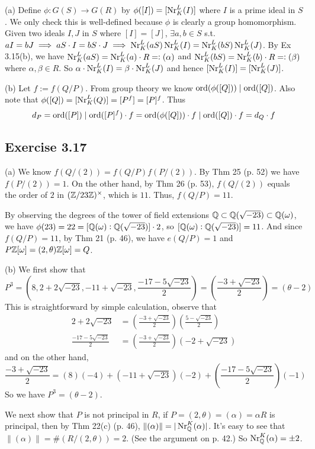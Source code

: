 \documentclass[../Marcus.tex]{subfiles}
\begin{document}
(a) Define $\phi:G(S)\to G(R)$ by $\phi([I])=[\operatorname{Nr}^L_K(I)]$ where $I$ is a prime ideal in $S$. We only check this is well-defined because $\phi$ is clearly a group homomorphism. Given two ideals $I,J$ in $S$ where $[I]=[J]$, $\exists a,b\in S$ s.t. $aI=bJ\implies aS\cdot I=bS\cdot J\implies \operatorname{Nr}^L_K(aS)\operatorname{Nr}^L_K(I)=\operatorname{Nr}^L_K(bS)\operatorname{Nr}^L_K(J)$. By Ex 3.15(b), we have $\operatorname{Nr}^L_K(aS)=\operatorname{Nr}^L_K(a)\cdot R=:(\alpha)$ and $\operatorname{Nr}^L_K(bS)=\operatorname{Nr}^L_K(b)\cdot R=:(\beta)$ where $\alpha,\beta\in R$. So $\alpha\cdot\operatorname{Nr}^L_K(I)=\beta\cdot\operatorname{Nr}^L_K(J)$ and hence $[\operatorname{Nr}^L_K(I)]=[\operatorname{Nr}^L_K(J)]$.

(b) Let $f:=f(Q/P)$. From group theory we know $\operatorname{ord}(\phi([Q]))\mid \operatorname{ord}([Q])$. Also note that $\phi([Q])=[\operatorname{Nr}^L_K(Q)]=[P^f]=[P]^f$. Thus $$d_P=\operatorname{ord}([P])\mid \operatorname{ord}([P]^f)\cdot f = \operatorname{ord}(\phi([Q]))\cdot f\mid \operatorname{ord}([Q])\cdot f=d_Q\cdot f$$

\subsection*{Exercise 3.17}

(a) We know $f(Q/(2))=f(Q/P)f(P/(2))$. By Thm 25 (p. 52) we have $f(P/(2))=1$. On the other hand, by Thm 26 (p. 53), $f(Q/(2))$ equals the order of $2$ in $(\mathbb{Z}/23\mathbb{Z})^{\times}$, which is $11$. Thus, $f(Q/P)=11$.

By observing the degrees of the tower of field extensions $\mathbb{Q}\subset \mathbb{Q}(\sqrt{-23})\subset \mathbb{Q}(\omega)$, we have $\phi(23)=22=[\mathbb{Q}(\omega):\mathbb{Q}(\sqrt{-23})]\cdot 2$, so $[\mathbb{Q}(\omega):\mathbb{Q}(\sqrt{-23})]=11$. And since $f(Q/P)=11$, by Thm 21 (p. 46), we have $e(Q/P)=1$ and $P\mathbb{Z}[\omega]=(2,\theta)\mathbb{Z}[\omega]=Q$.

(b) We first show that $$P^3=\left(8,2+2\sqrt{-23},-11+\sqrt{-23},\frac{-17-5\sqrt{-23}}{2}\right)=\left(\frac{-3+\sqrt{-23}}{2}\right)=(\theta-2)$$ This is straightforward by simple calculation, observe that
\begin{align*}
2+2\sqrt{-23} &= \left(\frac{-3+\sqrt{-23}}{2}\right)\left(\frac{5-\sqrt{-23}}{2}\right) \\
\frac{-17-5\sqrt{-23}}{2} &= \left(\frac{-3+\sqrt{-23}}{2}\right)(-2+\sqrt{-23})
\end{align*}
and on the other hand, $$\frac{-3+\sqrt{-23}}{2}=(8)(-4)+(-11+\sqrt{-23})(-2)+\left(\frac{-17-5\sqrt{-23}}{2}\right)(-1)$$ So we have $P^3=(\theta-2)$.

We next show that $P$ is not principal in $R$, if $P=(2,\theta)=(\alpha)=\alpha R$ is principal, then by Thm 22(c) (p. 46), $\|(\alpha)\|=|\operatorname{Nr}^K_{\mathbb{Q}}(\alpha)|$. It's easy to see that $\|(\alpha)\|=\#(R/(2,\theta))=2$. (See the argument on p. 42.) So $\operatorname{Nr}^K_{\mathbb{Q}}(\alpha)=\pm 2$.
\end{document}
